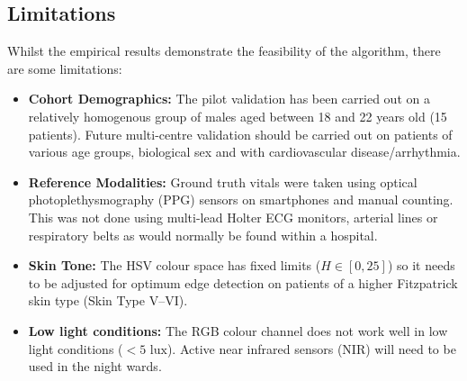 \documentclass[conference]{IEEEtran}
\begin{document}
\begin{table}[!t]
\caption{Algorithmic Performance Comparison}
\label{tab:performance}
\begin{center}
\end{center}
\end{table}

\subsection{Limitations}
Whilst the empirical results demonstrate the feasibility of the algorithm, there are some limitations:
\begin{itemize}
    \item \textbf{Cohort Demographics:} The pilot validation has been carried out on a relatively homogenous group of males aged between 18 and 22 years old (15 patients). Future multi-centre validation should be carried out on patients of various age groups, biological sex and with cardiovascular disease/arrhythmia.
    \item \textbf{Reference Modalities:} Ground truth vitals were taken using optical photoplethysmography (PPG) sensors on smartphones and manual counting. This was not done using multi-lead Holter ECG monitors, arterial lines or respiratory belts as would normally be found within a hospital.
    \item \textbf{Skin Tone:} The HSV colour space has fixed limits ($H \in [0, 25]$) so it needs to be adjusted for optimum edge detection on patients of a higher Fitzpatrick skin type (Skin Type V--VI).
    \item \textbf{Low light conditions:} The RGB colour channel does not work well in low light conditions ($< 5\text{ lux}$). Active near infrared sensors (NIR) will need to be used in the night wards.
\end{itemize}
\end{document}

